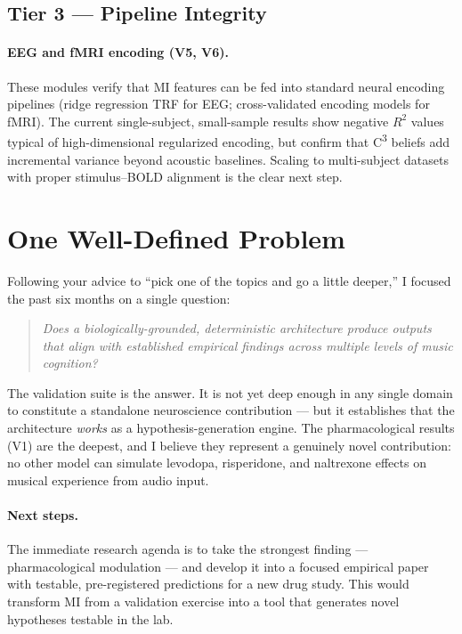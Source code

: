 \documentclass[11pt]{article}
\newcommand{\cthree}{C\textsuperscript{3}}
\begin{document}
\subsection{Tier 3 — Pipeline Integrity}

\paragraph{EEG and fMRI encoding (V5, V6).}
These modules verify that MI features can be fed into standard neural encoding pipelines (ridge regression TRF for EEG; cross-validated encoding models for fMRI). The current single-subject, small-sample results show negative $R^2$ values typical of high-dimensional regularized encoding, but confirm that \cthree{} beliefs add incremental variance beyond acoustic baselines. Scaling to multi-subject datasets with proper stimulus--BOLD alignment is the clear next step.

\section{One Well-Defined Problem}

Following your advice to ``pick one of the topics and go a little deeper,'' I focused the past six months on a single question:

\begin{quote}
\itshape Does a biologically-grounded, deterministic architecture produce outputs that align with established empirical findings across multiple levels of music cognition?
\end{quote}

The validation suite is the answer. It is not yet deep enough in any single domain to constitute a standalone neuroscience contribution --- but it establishes that the architecture \emph{works} as a hypothesis-generation engine. The pharmacological results (V1) are the deepest, and I believe they represent a genuinely novel contribution: no other model can simulate levodopa, risperidone, and naltrexone effects on musical experience from audio input.

\paragraph{Next steps.}
The immediate research agenda is to take the strongest finding --- pharmacological modulation --- and develop it into a focused empirical paper with testable, pre-registered predictions for a new drug study. This would transform MI from a validation exercise into a tool that generates novel hypotheses testable in the lab.
\end{document}
